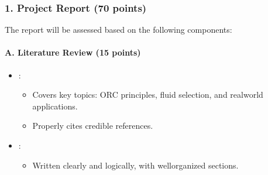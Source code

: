 \documentclass[letterpaper,10pt,english]{jupyterBook}
\begin{document}
\subsubsection{1. Project Report (70 points)}
\label{\detokenize{ProjectInstructions:id8}}
\sphinxAtStartPar
The report will be assessed based on the following components:


\paragraph{A. Literature Review (15 points)}
\label{\detokenize{ProjectInstructions:id9}}\begin{itemize}
\item {} 
\sphinxAtStartPar
{}:
\begin{itemize}
\item {} 
\sphinxAtStartPar
Covers key topics: ORC principles, fluid selection, and
real\sphinxhyphen{}world applications.

\item {} 
\sphinxAtStartPar
Properly cites credible references.

\end{itemize}

\item {} 
\sphinxAtStartPar
{}:
\begin{itemize}
\item {} 
\sphinxAtStartPar
Written clearly and logically, with well\sphinxhyphen{}organized sections.

\end{itemize}

\end{itemize}
\end{document}
